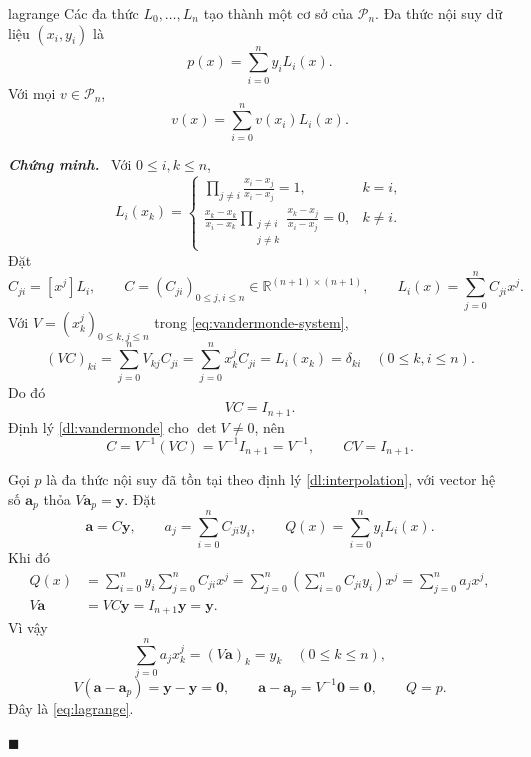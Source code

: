 \documentclass[12pt,a4paper,oneside]{book}
\numberwithin{algorithm}{chapter}
\theoremstyle{definition}
\newenvironment{chungminh}{\par\medskip\noindent\textbf{\textit{\color{mainblue}Chứng minh.}}\ }{\hfill$\blacksquare$\par\medskip}
\newcommand{\R}{\mathbb{R}}
\begin{document}
\begin{dinhly}{}{lagrange}
Các đa thức $L_0,\ldots,L_n$ tạo thành một cơ sở của $\mathcal P_n$. Đa thức nội suy dữ liệu $(x_i,y_i)$ là
\begin{equation}\label{eq:lagrange}
 p(x)=\sum_{i=0}^ny_iL_i(x).
\end{equation}
Với mọi $v\in\mathcal P_n$,
\begin{equation}\label{eq:cardinal}
 v(x)=\sum_{i=0}^nv(x_i)L_i(x).
\end{equation}
\end{dinhly}
\begin{chungminh}
Với $0\leq i,k\leq n$,
\[
 L_i(x_k)=
 \begin{cases}
 \displaystyle\prod_{j\ne i}\frac{x_i-x_j}{x_i-x_j}=1,&k=i,\\[2mm]
 \displaystyle\frac{x_k-x_k}{x_i-x_k}
  \prod_{\substack{j\ne i\\j\ne k}}\frac{x_k-x_j}{x_i-x_j}=0,&k\ne i.
 \end{cases}
\]
Đặt
\[
 C_{ji}=[x^j]L_i,\qquad
 C=(C_{ji})_{0\leq j,i\leq n}\in\R^{(n+1)\times(n+1)},\qquad
 L_i(x)=\sum_{j=0}^n C_{ji}x^j.
\]
Với $V=(x_k^j)_{0\leq k,j\leq n}$ trong \eqref{eq:vandermonde-system},
\[
 (VC)_{ki}=\sum_{j=0}^n V_{kj}C_{ji}
 =\sum_{j=0}^n x_k^jC_{ji}
 =L_i(x_k)=\delta_{ki}\quad(0\leq k,i\leq n).
\]
Do đó
\[
 VC=I_{n+1}.
\]
Định lý \ref{dl:vandermonde} cho $\det V\ne0$, nên
\[
 C=V^{-1}(VC)=V^{-1}I_{n+1}=V^{-1},\qquad CV=I_{n+1}.
\]

Gọi $p$ là đa thức nội suy đã tồn tại theo định lý \ref{dl:interpolation}, với vector hệ số $\mathbf a_p$ thỏa $V\mathbf a_p=\mathbf y$. Đặt
\[
 \mathbf a=C\mathbf y,\qquad
 a_j=\sum_{i=0}^n C_{ji}y_i,\qquad
 Q(x)=\sum_{i=0}^n y_iL_i(x).
\]
Khi đó
\begin{align*}
 Q(x)&=\sum_{i=0}^n y_i\sum_{j=0}^n C_{ji}x^j
 =\sum_{j=0}^n\left(\sum_{i=0}^n C_{ji}y_i\right)x^j
 =\sum_{j=0}^n a_jx^j,\\
 V\mathbf a&=VC\mathbf y=I_{n+1}\mathbf y=\mathbf y.
\end{align*}
Vì vậy
\[
 \sum_{j=0}^n a_jx_k^j=(V\mathbf a)_k=y_k\quad(0\leq k\leq n),
\]
\[
 V(\mathbf a-\mathbf a_p)=\mathbf y-\mathbf y=\mathbf0,
 \qquad
 \mathbf a-\mathbf a_p=V^{-1}\mathbf0=\mathbf0,
 \qquad Q=p.
\]
Đây là \eqref{eq:lagrange}.


\end{chungminh}
\end{document}

